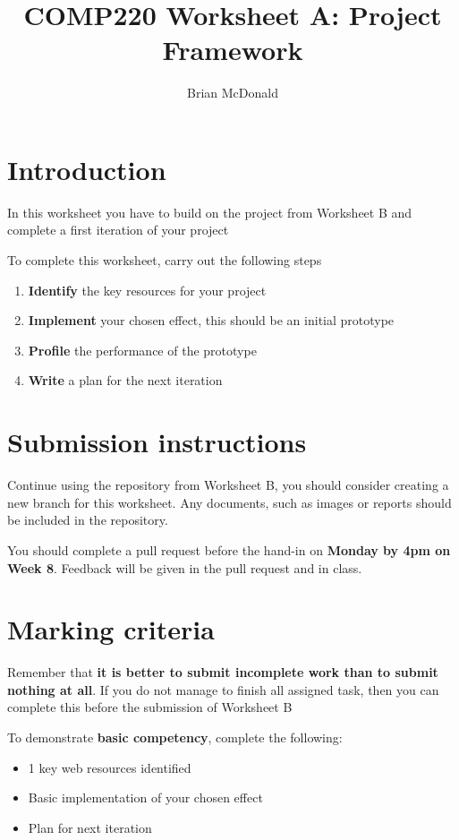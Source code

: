 \documentclass{../../../fal_assignment}
\title{COMP220 Worksheet A: Project Framework}
\author{Brian McDonald}
\begin{document}
\maketitle

\section*{Introduction}

In this worksheet you have to build on the project from Worksheet B and complete a first iteration of your project

To complete this worksheet, carry out the following steps
\begin{enumerate}[label=(\alph*)]
	\item \textbf{Identify} the key resources for your project
	\item \textbf{Implement} your chosen effect, this should be an initial prototype
	\item \textbf{Profile} the performance of the prototype
	\item \textbf{Write} a plan for the next iteration
\end{enumerate}

\section*{Submission instructions}

Continue using the repository from Worksheet B, you should consider creating a new branch for this worksheet. Any documents, such as images or reports should be included in the repository.

You should complete a pull request before the hand-in on \textbf{Monday by 4pm on Week 8}. Feedback will be given in the pull request and in class.

\section*{Marking criteria}

Remember that \textbf{it is better to submit incomplete work than to submit nothing at all}. If you do not manage to finish all assigned task, then you can complete this before the submission of Worksheet B

To demonstrate \textbf{basic competency}, complete the following:
\begin{itemize}
	\item 1 key web resources identified
	\item Basic implementation of your chosen effect
	\item Plan for next iteration
\end{itemize} 
\end{document}
